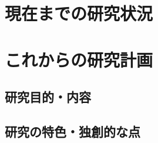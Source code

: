 \documentclass[11pt,a4paper,uplatex,twoside,dvipdfmx]{ujarticle} 	%
\newcommand{\研究課題名}{\mgfamily ストカスティックインフレーション, 原始ブラックホール, および重力波観測}
\newcommand{\研究機関名}{\mgfamily 名古屋大学}
\newcommand{\申請者氏名}{\mgfamily 多田 祐一郎}
\newcommand{\研究代表者氏名}{\申請者氏名}
\newcommand{\研究期間の最終元号年度}{34}	%
\begin{document}
\mgfamily\sffamily

\section{現在までの研究状況}
\newcommand{\現在までの研究状況}{%
	\begin{mdframed}[roundcorner=0.5zw,
	innertopmargin=0.8zw,innerbottommargin=0.8zw,
	linecolor=black!50,linewidth=0.2zw,
	backgroundcolor=black!10]
	{\bfseries\gtfamily\sffamily\large 1. 研究の学術的背景および核心となる「問い」}
	\end{mdframed}

	

}

\section{これからの研究計画}
\subsection{研究目的・内容}
\subsection{研究の特色・独創的な点}
\newcommand{\研究の特色と独創的な点}{%
}
\end{document}
